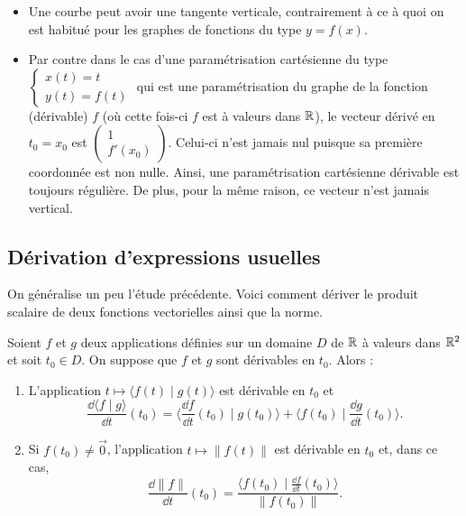 \documentclass[class=report,crop=false]{standalone}
\begin{document}
\begin{remarque*}
\sauteligne
\begin{itemize}
\item Une courbe peut avoir une tangente verticale, contrairement à ce
à quoi on est habitué pour les graphes de fonctions du type $y=f(x)$.

\item Par contre dans le cas d'une paramétrisation cartésienne du type $\left\{
\begin{array}{l}
x(t)=t\\
y(t)=f(t)
\end{array}
\right.$ qui est une paramétrisation du graphe de la fonction (dérivable)
$f$ (où cette fois-ci $f$ est à valeurs dans $\mathbb{R}$),
le vecteur dérivé en $t_0=x_0$ est $\left(
\begin{smallmatrix}
1\\
f'(x_0)
\end{smallmatrix}
\right)$. Celui-ci n'est jamais nul puisque sa première coordonnée
est non nulle. Ainsi, une paramétrisation cartésienne dérivable
est toujours régulière. De plus, pour la même raison, ce vecteur n'est jamais vertical.
\end{itemize}

\end{remarque*}


\subsection{Dérivation d'expressions usuelles}

On généralise un peu l'étude précédente.
Voici comment dériver le produit scalaire de deux fonctions vectorielles ainsi
que la norme.

\begin{theoreme}
Soient $f$ et $g$ deux applications définies sur un domaine $D$ de $\mathbb{R}$
à valeurs dans $\mathbb{R}^2$ et soit $t_0\in D$. On suppose que $f$ et $g$ sont dérivables en $t_0$. Alors :
\begin{enumerate}
\item L'application
$t\mapsto \big\langle f(t) \mid {g}(t) \big\rangle$
est dérivable en $t_0$ et
$$\frac{\dd \big\langle {f} \mid {g} \big\rangle}{\dd t}(t_0)
=\big\langle {\frac{\dd {f}}{\dd t}}(t_0) \mid {g}(t_0)\big\rangle+
\big\langle {f}(t_0) \mid {\frac{\dd {g}}{\dd t}}(t_0)\big\rangle.$$
\item Si ${f}(t_0)\neq\vec{0}$, l'application
$t\mapsto\|{f}(t)\|$ est dérivable en $t_0$ et, dans ce cas,
$$\frac{\dd\|{f}\|}{\dd t}(t_0)
=\frac{\big\langle {f}(t_0) \mid
{\frac{\dd {f}}{\dd t}}(t_0)\big\rangle}{\|{f}(t_0)\|}.$$
\end{enumerate}
\end{theoreme}
\end{document}
